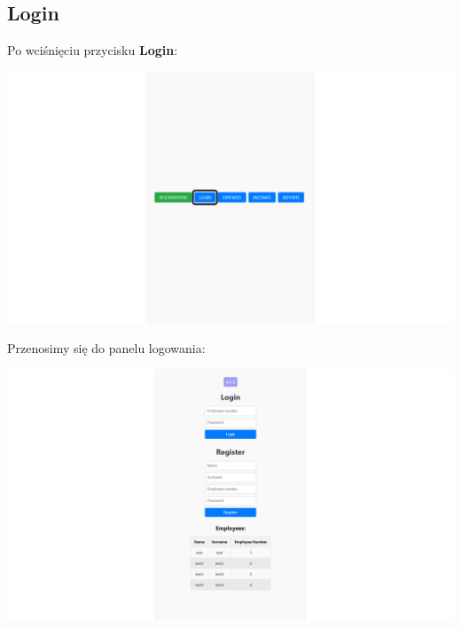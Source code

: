 \documentclass[12pt]{article}
\begin{document}
\newpage
\subsection{Login}
\begin{minipage}{\textwidth}
\noindent Po wciśnięciu przycisku \textbf{Login}:
\begin{center}
\includegraphics[width=\textwidth]{media/Login.png}
\end{center}
\end{minipage}

\begin{minipage}{\textwidth}
\noindent Przenosimy się do panelu logowania:
\begin{center}
\includegraphics[width=\textwidth]{media/Login_in.png}
\end{center}
\end{minipage}
\end{document}
